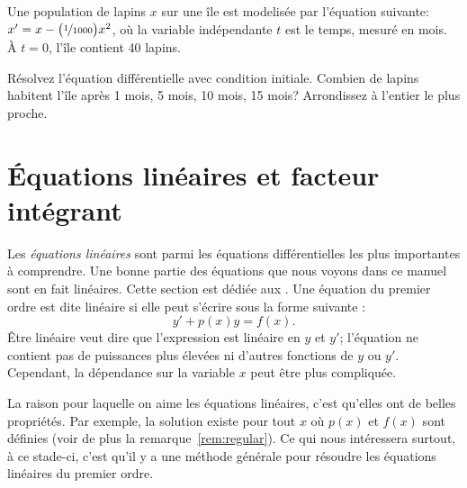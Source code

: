 \begin{exercise}
	Une population de lapins $x$ sur une île est modelisée par l'équation suivante:
	$x' = x- \bigl(\nicefrac{1}{1000} \bigr) x^2$,
	où la variable indépendante $t$ est le temps, mesuré en mois.
	À  $t=0$, l'île contient 40 lapins.
	\begin{tasks}
		\task Résolvez l'équation différentielle avec condition initiale.
		\task Combien de lapins habitent l'île après 1 mois, 5 mois, 10 mois, 15 mois?  Arrondissez à l'entier le plus proche.
	\end{tasks}
\end{exercise}


\sectionnewpage
\section{Équations linéaires et facteur intégrant}
\label{intfactor:section}


Les \emph{équations linéaires} sont parmi les équations différentielles les plus importantes à comprendre.
Une bonne partie des équations que nous voyons dans ce manuel sont en fait linéaires.
Cette section est dédiée aux \emph{}.
Une équation du premier ordre est dite linéaire si elle peut s'écrire sous la forme suivante :
\begin{equation} \label{lineq:eq1}
y' + p(x) y = f(x) .
\end{equation}
Être \og{}linéaire\fg{} veut dire que l'expression est linéaire en $y$ et $y'$;
l'équation ne contient pas de puissances plus élevées ni d'autres fonctions de $y$ ou $y'$.
Cependant, la dépendance sur la variable $x$ peut être plus compliquée.

La raison pour laquelle on aime les équations linéaires, c'est qu'elles ont de belles propriétés.
Par exemple, la solution existe pour tout $x$ où $p(x)$ et $f(x)$ sont définies (voir de plus la remarque~\ref{rem:regular}).
Ce qui nous intéressera surtout, à ce stade-ci, c'est qu'il y a une méthode générale pour résoudre les équations linéaires du premier ordre.

